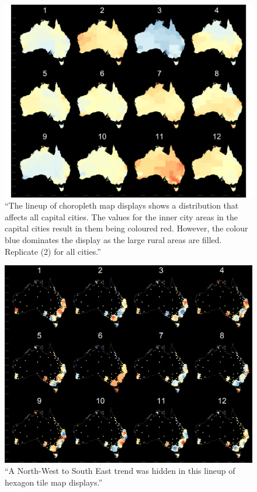 \documentclass[conference,final,]{IEEEtran}
\makeatletter
\def\maxwidth{\ifdim\Gin@nat@width>\linewidth\linewidth
\else\Gin@nat@width\fi}
\let\Oldincludegraphics\includegraphics
\renewcommand{\includegraphics}[1]{\Oldincludegraphics[width=\maxwidth]{#1}}
\makeatother
\begin{document}
\begin{figure}
\centering
\includegraphics{figures/aus_cities_3_geo.png}
\caption{``The lineup of choropleth map displays shows a distribution
that affects all capital cities. The values for the inner city areas in
the capital cities result in them being coloured red. However, the
colour blue dominates the display as the large rural areas are filled.
Replicate (2) for all cities.''}
\end{figure}

\begin{figure}
\centering
\includegraphics{figures/aus_nwse_6_hex.png}
\caption{``A North-West to South East trend was hidden in this lineup of
hexagon tile map displays.''}
\end{figure}
\end{document}
